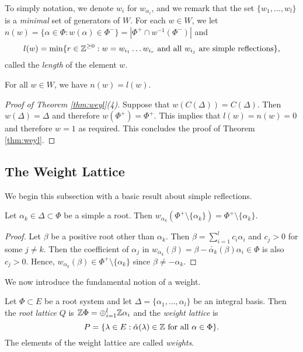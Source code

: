 To simply notation, we denote $w_i$ for $w_{\alpha_i}$, and we remark that the set $\{w_1,\ldots,w_l\}$ is a \textit{minimal} set of generators of $W$. For each $w\in W$, we let $n(w)=\{\alpha\in\Phi:w(\alpha)\in\Phi^-\}=|\Phi^+\cap w^{-1}(\Phi^-)|$
and
$$l(w)=\min\{r\in\mathbb{Z}^{\geq0}:w=w_{i_1}\ldots w_{i_r} \text{ and all } w_{i_j} \text{ are simple reflections}\},$$
called the \textit{length} of the element $w$.

\begin{proposition}
    For all $w\in W$, we have $n(w)=l(w)$.
\end{proposition}

\begin{proof}[Proof of Theorem \ref{thm:weyl}(4)]
    Suppose that $w(C(\Delta))=C(\Delta)$. Then $w(\Delta)=\Delta$ and therefore $w(\Phi^+)=\Phi^+$. This implies that $l(w)=n(w)=0$ and therefore $w=1$ as required. This concludes the proof of Theorem \ref{thm:weyl}.
\end{proof}





\subsection{The Weight Lattice}

We begin this subsection with a basic result about simple reflections.

\begin{lemma}
    Let $\alpha_k\in\Delta\subset\Phi$ be a simple a root. Then $w_{\alpha_k}(\Phi^+\setminus\{\alpha_k\})=\Phi^+\setminus\{\alpha_k\}$.
\end{lemma}

\begin{proof}
    Let $\beta$ be a positive root other than $\alpha_k$. Then $\beta=\sum_{i=1}^{l}c_i\alpha_i$ and $c_j> 0$ for some $j\neq k$. Then the coefficient of $\alpha_j$ in $w_{\alpha_k}(\beta)=\beta-\check{\alpha_k}(\beta)\alpha_i\in\Phi$ is also $c_j>0$. Hence, $w_{\alpha_k}(\beta)\in\Phi^+\setminus\{\alpha_k\}$ since $\beta\neq-\alpha_k$.
\end{proof}

We now introduce the fundamental notion of a weight.

\begin{definition}
    Let $\Phi\subset E$ be a root system and let $\Delta=\{\alpha_1,\ldots,\alpha_l\}$ be an integral basis. Then the \textit{root lattice} $Q$ is $\mathbb{Z}\Phi=\oplus_{i=1}^l\mathbb{Z}\alpha_i$ and the \textit{weight lattice} is 
    $$P=\{\lambda\in E:\check{\alpha}(\lambda)\in\mathbb{Z}\text{ for all }\alpha\in\Phi\}.$$
    The elements of the weight lattice are called \textit{weights}.
\end{definition}

